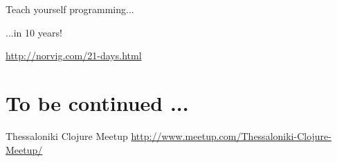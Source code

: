 \documentclass[10pt, compress]{beamer}
\begin{document}
\begin{frame}{Teach yourself programming...}

  \begin{center}

  \begin{huge} ...in 10 years! \end{huge}

  \url{http://norvig.com/21-days.html}

  \end{center}

\end{frame}

\section{To be continued ...}

\begin{frame}{Thessaloniki Clojure Meetup}
  \url{http://www.meetup.com/Thessaloniki-Clojure-Meetup/}
\end{frame}

\end{document}
